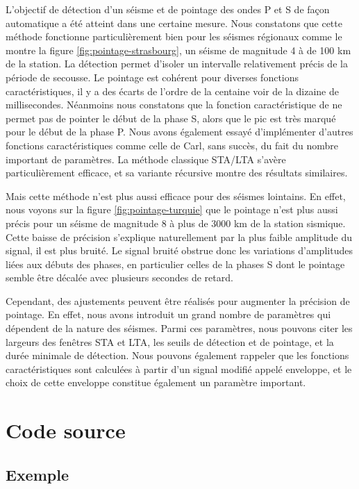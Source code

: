 \documentclass[a4paper, 11pt]{article} %
\begin{document}
L'objectif de détection d'un séisme et de pointage des ondes P et S de façon automatique a été atteint dans une certaine mesure. Nous constatons que cette méthode fonctionne particulièrement bien pour les séismes régionaux comme le montre la figure \ref{fig:pointage-strasbourg}, un séisme de magnitude 4 à de 100 km de la station. La détection permet d'isoler un intervalle relativement précis de la période de secousse. Le pointage est cohérent pour diverses fonctions caractéristiques, il y a des écarts de l'ordre de la centaine voir de la dizaine de millisecondes. Néanmoins nous constatons que la fonction caractéristique de \cite{baer1987} ne permet pas de pointer le début de la phase S, alors que le pic est très marqué pour le début de la phase P. Nous avons également essayé d'implémenter d'autres fonctions caractéristiques comme celle de Carl, sans succès, du fait du nombre important de paramètres. La méthode classique STA/LTA s'avère particulièrement efficace, et sa variante récursive montre des résultats similaires.

Mais cette méthode n'est plus aussi efficace pour des séismes lointains. En effet, nous voyons sur la figure \ref{fig:pointage-turquie} que le pointage n'est plus aussi précis pour un séisme de magnitude 8 à plus de 3000 km de la station sismique. Cette baisse de précision s'explique naturellement par la plus faible amplitude du signal, il est plus bruité. Le signal bruité obstrue donc les variations d'amplitudes liées aux débuts des phases, en particulier celles de la phases S dont le pointage semble être décalée avec plusieurs secondes de retard. 

Cependant, des ajustements peuvent être réalisés pour augmenter la précision de pointage. En effet, nous avons introduit un grand nombre de paramètres qui dépendent de la nature des séismes. Parmi ces paramètres, nous pouvons citer les largeurs des fenêtres STA et LTA, les seuils de détection et de pointage, et la durée minimale de détection. Nous pouvons également rappeler que les fonctions caractéristiques sont calculées à partir d'un signal modifié appelé enveloppe, et le choix de cette enveloppe constitue également un paramètre important. 

\section{Code source}

\subsection{Exemple}
\end{document}
